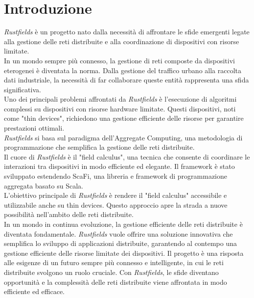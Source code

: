 \section{Introduzione}

\textit{Rustfields} è un progetto nato dalla necessità di affrontare le sfide emergenti legate alla gestione delle reti distribuite e alla
coordinazione di dispositivi con risorse limitate. \\

In un mondo sempre più connesso, la gestione di reti composte da dispositivi eterogenei è diventata la norma.
Dalla gestione del traffico urbano alla raccolta dati industriale, la necessità di far collaborare queste entità rappresenta una sfida significativa.\\

Uno dei principali problemi affrontati da \textit{Rustfields} è l'esecuzione di algoritmi complessi su dispositivi con risorse hardware limitate.
Questi dispositivi, noti come "thin devices", richiedono una gestione efficiente delle risorse per garantire prestazioni ottimali. \\

\textit{Rustfields} si basa sul paradigma dell'Aggregate Computing, una metodologia di programmazione che semplifica la gestione delle reti distribuite.\\

Il cuore di \textit{Rustfields} è il "field calculus", una tecnica che consente di coordinare le interazioni tra dispositivi in modo efficiente ed elegante.
Il framework è stato sviluppato estendendo ScaFi, una libreria e framework di programmazione aggregata basato su Scala.\\

L'obiettivo principale di \textit{Rustfields} è rendere il "field calculus" accessibile e utilizzabile anche su thin devices.
Questo approccio apre la strada a nuove possibilità nell'ambito delle reti distribuite.\\

In un mondo in continua evoluzione, la gestione efficiente delle reti distribuite è diventata fondamentale.
\textit{Rustfields} vuole offrire una soluzione innovativa che semplifica lo sviluppo di applicazioni distribuite, garantendo al contempo una
gestione efficiente delle risorse limitate dei dispositivi. Il progetto è una risposta alle esigenze di un futuro sempre più
connesso e intelligente, in cui le reti distribuite svolgono un ruolo cruciale. Con \textit{Rustfields}, le sfide diventano opportunità e
la complessità delle reti distribuite viene affrontata in modo efficiente ed efficace.
